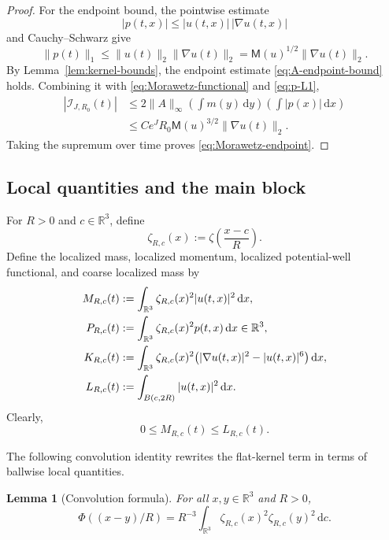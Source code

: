 \documentclass{interact}
\numberwithin{equation}{section}
\theoremstyle{plain}
\newtheorem{lemma}[theorem]{Lemma}
\theoremstyle{definition}
\theoremstyle{remark}
\newcommand{\R}{\mathbb R}
\newcommand{\M}{\mathsf M}
\newcommand{\dd}{\,\mathrm d}
\begin{document}
\begin{proof}
For the endpoint bound, the pointwise estimate
\[
 |p(t,x)|\le |u(t,x)|\,|\nabla u(t,x)|
\]
and Cauchy--Schwarz give
\begin{equation}\label{eq:p-L1}
 \|p(t)\|_1
 \le\|u(t)\|_2\|\nabla u(t)\|_2
 =\M(u)^{1/2}\|\nabla u(t)\|_2.
\end{equation}
By Lemma~\ref{lem:kernel-bounds}, the endpoint estimate \eqref{eq:A-endpoint-bound} holds. Combining it with \eqref{eq:Morawetz-functional} and \eqref{eq:p-L1},
\begin{align*}
 |\mathcal I_{J,R_0}(t)|
 &\le2\|A\|_\infty
 \left(\int m(y)\dd y\right)
 \left(\int|p(x)|\dd x\right)\\
 &\le Ce^JR_0\M(u)^{3/2}\|\nabla u(t)\|_2.
\end{align*}
Taking the supremum over time proves \eqref{eq:Morawetz-endpoint}.
\end{proof}

\subsection{Local quantities and the main block}

For $R>0$ and $c\in\R^3$, define
\begin{equation}\label{eq:zeta-Rc}
 \zeta_{R,c}(x):=\zeta\left(\frac{x-c}{R}\right).
\end{equation}
Define the localized mass, localized momentum, localized potential-well functional, and coarse localized mass by
\begin{align}
 M_{R,c}(t)
 &:=\int_{\R^3}\zeta_{R,c}(x)^2|u(t,x)|^2\dd x,\notag\\
 P_{R,c}(t)
 &:=\int_{\R^3}\zeta_{R,c}(x)^2p(t,x)\dd x\in\R^3,\notag\\
 K_{R,c}(t)
 &:=\int_{\R^3}\zeta_{R,c}(x)^2
 \bigl(|\nabla u(t,x)|^2-|u(t,x)|^6\bigr)\dd x,\notag\\
 L_{R,c}(t)
 &:=\int_{B(c,2R)}|u(t,x)|^2\dd x.
 \label{eq:local-L}
\end{align}
Clearly,
\begin{equation}\label{eq:M-le-L}
 0\le M_{R,c}(t)\le L_{R,c}(t).
\end{equation}

The following convolution identity rewrites the flat-kernel term in terms of ballwise local quantities.

\begin{lemma}[Convolution formula]\label{lem:convolution}
For all $x,y\in\R^3$ and $R>0$,
\begin{equation}\label{eq:Phi-convolution}
 \Phi((x-y)/R)
 =R^{-3}\int_{\R^3}
 \zeta_{R,c}(x)^2\zeta_{R,c}(y)^2\dd c.
\end{equation}
\end{lemma}
\end{document}
